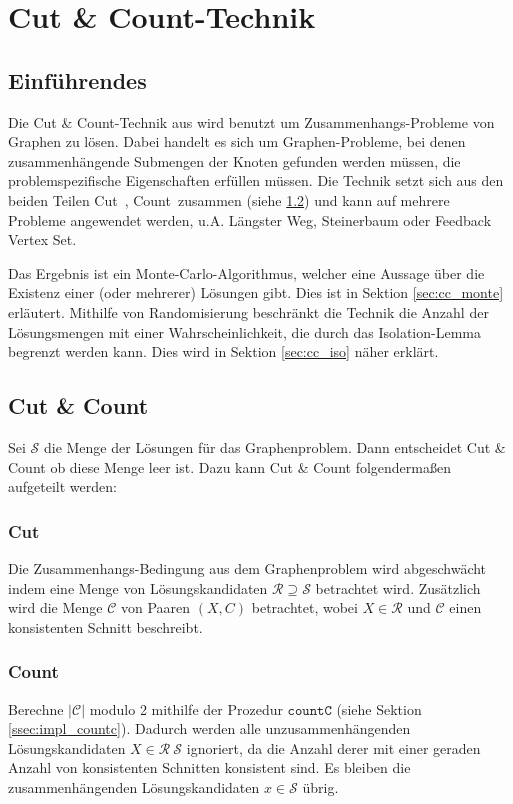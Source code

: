 \chapter{Cut \& Count-Technik}
\label{c:cc_general}

\section{Einführendes}
\label{sec:cc_intro}
Die Cut \& Count-Technik aus \cite{cygan_solving_2011} wird benutzt um Zusammenhangs-Probleme von Graphen zu lösen.
Dabei handelt es sich um Graphen-Probleme, bei denen zusammenhängende Submengen der Knoten gefunden werden müssen, die problemspezifische  Eigenschaften erfüllen müssen. 
Die Technik setzt sich aus den beiden Teilen \glqq Cut\grqq ~, \glqq Count\grqq ~zusammen (siehe \ref{sec:cc_cc}) und kann auf mehrere Probleme angewendet werden, u.A. Längster Weg, Steinerbaum oder Feedback Vertex Set.

Das Ergebnis ist ein Monte-Carlo-Algorithmus, welcher eine Aussage über die Existenz einer (oder mehrerer) Lösungen gibt. Dies ist in Sektion \ref{sec:cc_monte} erläutert.
Mithilfe von Randomisierung beschränkt die Technik die Anzahl der Lösungsmengen mit einer Wahrscheinlichkeit, die durch das Isolation-Lemma begrenzt werden kann. Dies wird in Sektion \ref{sec:cc_iso} näher erklärt.


\section{Cut \& Count}
\label{sec:cc_cc}
Sei $\mathcal{S}$ die Menge der Lösungen für das Graphenproblem. 
Dann entscheidet Cut \& Count ob diese Menge leer ist. 
Dazu kann Cut \& Count folgendermaßen aufgeteilt werden:

\subsection{Cut}
\label{ssec:cc_cut}
Die Zusammenhangs-Bedingung aus dem Graphenproblem wird abgeschwächt indem eine Menge von Lösungskandidaten $\mathcal{R} \supseteq \mathcal{S}$ betrachtet wird. 
Zusätzlich wird die Menge $\mathcal{C}$ von Paaren $(X,C)$ betrachtet, wobei $X \in \mathcal{R}$ und $\mathcal{C}$ einen konsistenten Schnitt beschreibt. 

\subsection{Count}
\label{ssec:cc_count}
Berechne $|\mathcal{C}|$ modulo 2 mithilfe der Prozedur $\mathtt{countC}$ (siehe Sektion \ref{ssec:impl_countc}). 
Dadurch werden alle unzusammenhängenden Lösungskandidaten $X \in \mathcal{R} \ \mathcal{S}$ ignoriert, da die Anzahl derer mit einer geraden Anzahl von konsistenten Schnitten konsistent sind. Es bleiben die zusammenhängenden Lösungskandidaten $x \in \mathcal{S}$ übrig. 

